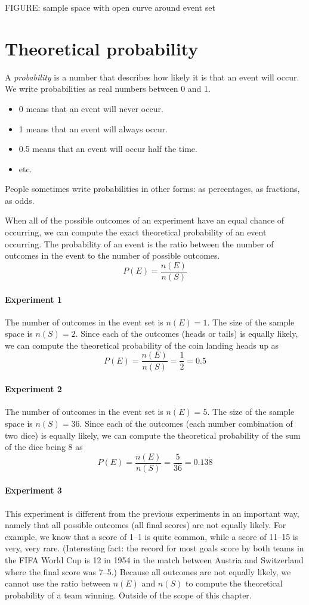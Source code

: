 \documentclass[a4paper,11pt]{report}
\begin{document}
FIGURE: sample space with open curve around event set

\section{Theoretical probability}
A {\em probability} is a number that describes how likely it is that
an event will occur. We write probabilities as real numbers between 0
and 1.
\begin{itemize}
\item 0 means that an event will never occur.
\item 1 means that an event will always occur.
\item 0.5 means that an event will occur half the time.
\item etc.
\end{itemize}
People sometimes write probabilities in other forms: as percentages,
as fractions, as odds.

When all of the possible outcomes of an experiment have an equal
chance of occurring, we can compute the exact theoretical probability
of an event occurring. The probability of an event is the ratio
between the number of outcomes in the event to the number of possible
outcomes.
\[P(E) = \frac{n(E)}{n(S)}\]

\paragraph{Experiment 1} The number of outcomes in the event set is
\(n(E)=1\). The size of the sample space is \(n(S)=2\). Since each of
the outcomes (heads or tails) is equally likely, we can compute the
theoretical probability of the coin landing heads up as
\[P(E) = \frac{n(E)}{n(S)} = \frac{1}{2} = 0.5\]

\paragraph{Experiment 2} The number of outcomes in the event set is
\(n(E)=5\). The size of the sample space is \(n(S)=36\). Since each of
the outcomes (each number combination of two dice) is equally likely,
we can compute the theoretical probability of the sum of the dice being 8 as
\[P(E) = \frac{n(E)}{n(S)} = \frac{5}{36} = 0.13\dot{8}\]

\paragraph{Experiment 3} This experiment is different from the
previous experiments in an important way, namely that all possible
outcomes (all final scores) are not equally likely. For example, we
know that a score of 1--1 is quite common, while a score of 11--15 is
very, very rare. (Interesting fact: the record for most goals score by
both teams in the FIFA World Cup is 12 in 1954 in the match between
Austria and Switzerland where the final score was 7--5.)  Because all
outcomes are not equally likely, we cannot use the ratio between
\(n(E)\) and \(n(S)\) to compute the theoretical probability of a team
winning. Outside of the scope of this chapter.
\end{document}
